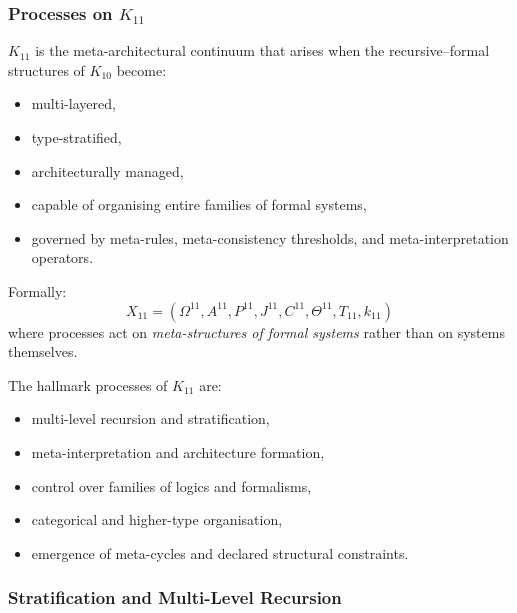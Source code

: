 

\subsubsection{Processes on $K_{11}$}
\label{sec:processes-k11}

$K_{11}$ is the meta-architectural continuum that arises when the
recursive–formal structures of $K_{10}$ become:
\begin{itemize}
    \item multi-layered,
    \item type-stratified,
    \item architecturally managed,
    \item capable of organising entire families of formal systems,
    \item governed by meta-rules, meta-consistency thresholds,
          and meta-interpretation operators.
\end{itemize}

Formally:
\[
X_{11} = (\Omega^{11}, A^{11}, P^{11}, J^{11},
          C^{11}, \Theta^{11}, T_{11}, k_{11})
\]
where processes act on \emph{meta-structures of formal systems} rather
than on systems themselves.

The hallmark processes of $K_{11}$ are:
\begin{itemize}
    \item multi-level recursion and stratification,
    \item meta-interpretation and architecture formation,
    \item control over families of logics and formalisms,
    \item categorical and higher-type organisation,
    \item emergence of meta-cycles and declared structural constraints.
\end{itemize}

\subsubsection{Stratification and Multi-Level Recursion}

